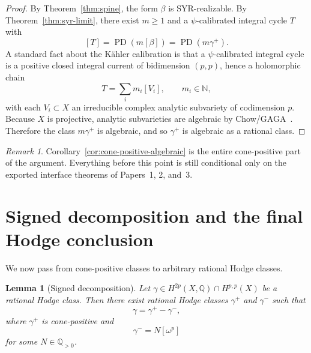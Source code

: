 \documentclass[11pt]{article}
\numberwithin{equation}{section}
\theoremstyle{plain}
\newtheorem{lemma}[theorem]{Lemma}
\theoremstyle{definition}
\theoremstyle{remark}
\newtheorem{remark}[theorem]{Remark}
\DeclareMathOperator{\PD}{PD}
\newcommand{\Q}{\mathbb{Q}}
\newcommand{\N}{\mathbb{N}}
\begin{document}
\begin{proof}
By Theorem~\ref{thm:spine}, the form $\beta$ is SYR-realizable. By Theorem~\ref{thm:syr-limit}, there exist $m\ge 1$ and a $\psi$-calibrated integral cycle $T$ with
\[
[T]=\PD(m[\beta])=\PD(m\gamma^+).
\]
A standard fact about the K\"ahler calibration is that a $\psi$-calibrated integral cycle is a positive closed integral current of bidimension $(p,p)$, hence a holomorphic chain~\cite{HL82,King71}
\[
T=\sum_i m_i[V_i],
\qquad
m_i\in\N,
\]
with each $V_i\subset X$ an irreducible complex analytic subvariety of codimension $p$. Because $X$ is projective, analytic subvarieties are algebraic by Chow/GAGA~\cite{Chow49,Serre56,GH78,Hartshorne77}. Therefore the class $m\gamma^+$ is algebraic, and so $\gamma^+$ is algebraic as a rational class.
\end{proof}

\begin{remark}
Corollary~\ref{cor:cone-positive-algebraic} is the entire cone-positive part of the argument. Everything before this point is still conditional only on the exported interface theorems of Papers~1, 2, and~3.
\end{remark}

\section{Signed decomposition and the final Hodge conclusion}\label{sec:signed}

We now pass from cone-positive classes to arbitrary rational Hodge classes.

\begin{lemma}[Signed decomposition]\label{lem:signed}
Let $\gamma\in H^{2p}(X,\Q)\cap H^{p,p}(X)$ be a rational Hodge class. Then there exist rational Hodge classes $\gamma^+$ and $\gamma^-$ such that
\[
\gamma=\gamma^+-\gamma^-,
\]
where $\gamma^+$ is cone-positive and
\[
\gamma^- = N[\omega^p]
\]
for some $N\in\Q_{>0}$.
\end{lemma}
\end{document}
